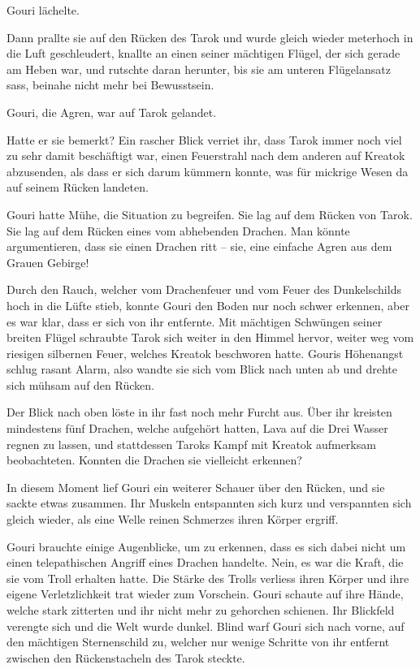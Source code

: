 \documentclass[10pt, a4paper, oneside]{book}
\begin{document}
Gouri lächelte.

Dann prallte sie auf den Rücken des Tarok und wurde gleich wieder meterhoch in die Luft geschleudert, knallte an einen seiner mächtigen Flügel, der sich gerade am Heben war, und rutschte daran herunter, bis sie am unteren Flügelansatz sass, beinahe nicht mehr bei Bewusstsein.

Gouri, die Agren, war auf Tarok gelandet.

Hatte er sie bemerkt? Ein rascher Blick verriet ihr, dass Tarok immer noch viel zu sehr damit beschäftigt war, einen Feuerstrahl nach dem anderen auf Kreatok abzusenden, als dass er sich darum kümmern konnte, was für mickrige Wesen da auf seinem Rücken landeten.

Gouri hatte Mühe, die Situation zu begreifen. Sie lag auf dem Rücken von Tarok. Sie lag auf dem Rücken eines vom abhebenden Drachen. Man könnte argumentieren, dass sie einen Drachen ritt – sie, eine einfache Agren aus dem Grauen Gebirge!

Durch den Rauch, welcher vom Drachenfeuer und vom Feuer des Dunkelschilds hoch in die Lüfte stieb, konnte Gouri den Boden nur noch schwer erkennen, aber es war klar, dass er sich von ihr entfernte. Mit mächtigen Schwüngen seiner breiten Flügel schraubte Tarok sich weiter in den Himmel hervor, weiter weg vom riesigen silbernen Feuer, welches Kreatok beschworen hatte. Gouris Höhenangst schlug rasant Alarm, also wandte sie sich vom Blick nach unten ab und drehte sich mühsam auf den Rücken.

Der Blick nach oben löste in ihr fast noch mehr Furcht aus. Über ihr kreisten mindestens fünf Drachen, welche aufgehört hatten, Lava auf die Drei Wasser regnen zu lassen, und stattdessen Taroks Kampf mit Kreatok aufmerksam beobachteten. Konnten die Drachen sie vielleicht erkennen?

In diesem Moment lief Gouri ein weiterer Schauer über den Rücken, und sie sackte etwas zusammen. Ihr Muskeln entspannten sich kurz und verspannten sich gleich wieder, als eine Welle reinen Schmerzes ihren Körper ergriff.

Gouri brauchte einige Augenblicke, um zu erkennen, dass es sich dabei nicht um einen telepathischen Angriff eines Drachen handelte. Nein, es war die Kraft, die sie vom Troll erhalten hatte. Die Stärke des Trolls verliess ihren Körper und ihre eigene Verletzlichkeit trat wieder zum Vorschein. Gouri schaute auf ihre Hände, welche stark zitterten und ihr nicht mehr zu gehorchen schienen. Ihr Blickfeld verengte sich und die Welt wurde dunkel. Blind warf Gouri sich nach vorne, auf den mächtigen Sternenschild zu, welcher nur wenige Schritte von ihr entfernt zwischen den Rückenstacheln des Tarok steckte.
\end{document}
